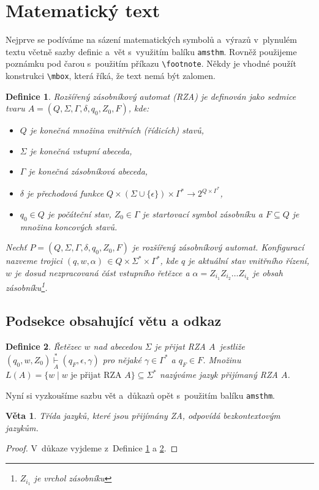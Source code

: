 \documentclass[11pt,twocolumn]{article}
\newtheorem{definice}{Definice}
\theoremstyle{plain}
\newtheorem{veta}{Věta}
\begin{document}
\section{Matematický text}
Nejprve se podíváme na sázení matematických symbolů a~výrazů v~plynulém textu včetně sazby definic a~vět s~využitím balíku \texttt{amsthm}. Rovněž použijeme poznámku pod čarou s~použitím příkazu \texttt{\textbackslash footnote}. Někdy je vhodné použít konstrukci \texttt{\textbackslash mbox\string{\string}}, která říká, že text nemá být zalomen.
\begin{definice}\label{def1}
    \emph{Rozšířený zásobníkový automat (RZA)} je definován jako sedmice tvaru $A = (Q,\Sigma,\Gamma,\delta,q_0,Z_0,F)$, kde:
    \begin{itemize}
        \item $Q$ je konečná množina \emph{vnitřních (řídicích) stavů,}
        \item $\Sigma$ je konečná \emph{vstupní abeceda,}
        \item $\Gamma$ je konečná \emph{zásobníková abeceda,}
        \item $\delta$ je \emph{přechodová funkce} $Q \times(\Sigma \cup\{\epsilon\}) \times \Gamma^{*} \rightarrow 2^{Q \times \Gamma^{*}}$,
        \item $q_0 \in Q$ je \emph{počáteční stav}, $Z_0 \in \Gamma$ je \emph{startovací symbol zásobníku} a $F \subseteq Q$ je množina \emph{koncových stavů.}
    \end{itemize}
    
    \emph{Nechť $P = (Q,\Sigma,\Gamma,\delta,q_0,Z_0,F)$ je rozšířený zásobníkový automat.} Konfigurací \emph{nazveme trojici $(q, w,\alpha)\,\in Q \times \Sigma^{*} \times \Gamma^{*}$, kde $q$ je aktuální stav vnitřního řízení, $w$ je dosud nezpracovaná část vstupního řetězce a $\alpha = Z_{i_1}Z_{i_2}\dots Z_{i_k}$ je obsah zásobníku\footnote{$Z_{i_1}$ je vrchol zásobníku}.}
\end{definice}
\subsection{Podsekce obsahující větu a odkaz}
\begin{definice}\label{def2}
    \emph{Řetězec $w$ nad abecedou $\Sigma$ je přijat RZA} $A$~jestliže $(q_0,w,Z_0)\overset{*}{\underset{A}\vdash}(q_F,\epsilon,\gamma)$ pro nějaké $\gamma \in \Gamma^{*}
    $ a $q_F \in F$. Množinu $L(A) = \{w\mid w \text{ je přijat RZA } A\} \subseteq \Sigma^{*}$ nazýváme \emph{jazyk přijímaný RZA} $A$. 
\end{definice}
Nyní si vyzkoušíme sazbu vět a~důkazů opět s~použitím balíku \texttt{amsthm}.
\begin{veta}
    Třída jazyků, které jsou přijímány ZA, odpovídá \emph{bezkontextovým jazykům.}
\end{veta}
\begin{proof}
    V~důkaze vyjdeme z~Definice \ref{def1} a \ref{def2}.
\end{proof}
\end{document}

